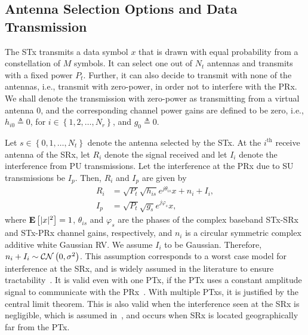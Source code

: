 \documentclass[12pt,draftcls,peerreview,onecolumn]{IEEEtran}
\newcommand{\CN}{{\cal CN}}
\newcommand{\define}{\triangleq}
\newcommand{\ie}{{i.e.}}
\newcommand{\expect}[1]{{\bf{E}}\left[{#1}\right]}
\newcommand{\nx}{{0}}
\newcommand{\Nt}{{N_t}}
\newcommand{\Nr}{{N_r}}
\newcommand{\Pt}{{P_t}}
\newcommand{\such}{h}
\newcommand{\puch}{g}
\newcommand{\hk}[1]{{\such_{#1}}}
\newcommand{\gk}[1]{{\puch_{#1}}}
\newcommand{\Rsrx}{R_{i}}
\newcommand{\Iprx}{I_{p}}
\newcommand{\Isrx}{I_{i}}
\newcommand{\noise}{n_i}
\newcommand{\noisevar}{\sigma^2}
\newcommand{\allopts}{\left\{\nx,1,\ldots,\Nt\right\}}
\newcommand{\nropts}{\left\{1,2,\ldots,\Nr\right\}}
\newcommand{\suchph}{\theta}
\newcommand{\puchph}{\varphi}
\newcommand{\thetahk}{\suchph_{is}}
\newcommand{\thetagk}{\puchph_{s}}
\newcommand{\ith}{i^{\text{th}}}
\begin{document}
\subsection{Antenna Selection Options and Data Transmission}
The STx transmits a data symbol $x$ that is drawn with equal probability from a constellation of $M$ symbols. It can select one out of $\Nt$ antennas and transmits with a fixed power $\Pt$. Further, it can also decide to transmit with none of the antennas, \ie, transmit with zero-power, in order not to interfere with the PRx. We shall denote the transmission with zero-power as transmitting from a virtual antenna $\nx$, and the corresponding channel power gains are defined to be zero, \ie, $\hk{i\nx} \define 0$, for $i\in\nropts$, and $\gk{\nx}\define 0$. 

Let $s\in\allopts$ denote the antenna selected by the STx. %
 At the $\ith$ receive antenna of the SRx, let $\Rsrx$ denote the signal received and let $\Isrx$ denote the interference from PU transmissions. Let the interference at the PRx due to SU transmissions be $\Iprx$. Then, $\Rsrx$ and $\Iprx$ are given by
%
\begin{align}
\label{eq:r_su}
 \Rsrx &= \sqrt{\Pt}\sqrt{\hk{is}} e^{j\thetahk}x + \noise + \Isrx, \\
 \label{eq:i}
 \Iprx &= \sqrt{\Pt}\sqrt{\gk{s}} e^{j\thetagk}x ,
\end{align}
%
where $\expect{|x|^2}=1$, $\thetahk$ and $\thetagk$ are the phases of the complex baseband STx-SRx and STx-PRx channel gains, respectively, and $\noise$ is a circular symmetric complex additive white Gaussian RV. We assume $\Isrx$ to be Gaussian. Therefore, $\noise + \Isrx\sim \CN\left(0,\noisevar\right)$. This assumption corresponds to a worst case model for interference at the SRx, and is widely assumed in the literature to ensure tractability~\cite{Sarvendranath_2013_TCOM,Wang_2011_TCom, Kashyap_2014_TCOM,Sarvendranath_2014_TCOM}. It is valid even with one PTx, if the PTx uses a constant amplitude signal to communicate with the PRx~\cite{Kashyap_2014_TCOM}. With multiple PTxs, it is justified by the central limit theorem. This is also valid when the interference seen at the SRx is negligible, which is assumed in~\cite{Zhou_2009_WCNC,musavian_2009_tcom,RZhang_2009_TWC,li_2011_pimrc,Sboui_2013_TWC}, and occurs when SRx is located geographically far from the PTx.
\end{document}
